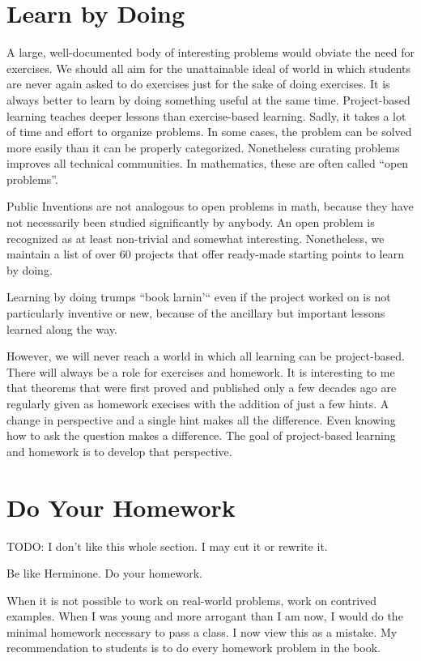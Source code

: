 \documentclass[
	fontsize=10pt, %
	twoside=false, %
	secnumdepth=1, %
]{kaobook}
\begin{document}
\section{Learn by Doing}

A large, well-documented body of interesting problems would obviate
the need for exercises.
We should all aim for the unattainable ideal of world in which students are never again
asked to do exercises just for the sake of doing exercises.
It is always better to learn by doing something useful at the same time.
Project-based learning teaches deeper lessons than exercise-based learning.
Sadly, it takes a lot of time and effort to organize problems.
In some cases, the problem can be solved more easily than it can be properly categorized.
Nonetheless curating problems improves all technical communities.
In mathematics, these are often called ``open problems''.

Public Inventions are not analogous to open problems in math, because they
have not necessarily been studied significantly by anybody. An open problem
is recognized as at least non-trivial and somewhat interesting.
Nonetheless, we maintain a list of over 60 projects that offer ready-made
starting points to learn by doing.

Learning by doing trumps ``book larnin'`` even if the project worked on
is not particularly inventive or new, because of the ancillary but important
lessons learned along the way.

However, we will never reach a world in which all learning can be project-based.
There will always be a role for exercises and homework.
It is interesting to me that theorems that were first proved and published only a few decades
ago are regularly given as homework execises with the addition of just a few hints.
A change in perspective and a single hint makes all the difference.
Even knowing how to ask the question makes a difference.
The goal of project-based learning and homework is to develop that perspective.

\section{Do Your Homework}

TODO: I don't like this whole section. I may cut it or rewrite it.

Be like Herminone. Do your homework.

When it is not possible to work on real-world problems, work on contrived examples.
When I was young and more arrogant than I am now, I would do the minimal homework
necessary to pass a class.
I now view this as a mistake.
My recommendation to students is to do every homework problem in the book.
\end{document}
